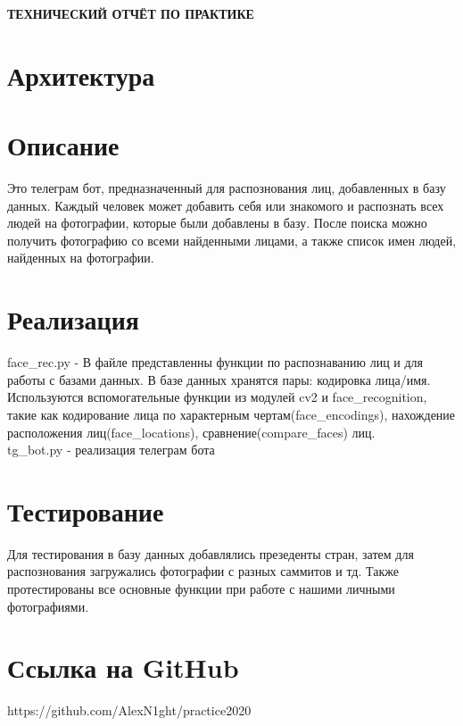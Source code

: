 \begin{center}
\bfseries{\large ТЕХНИЧЕСКИЙ ОТЧЁТ ПО ПРАКТИКЕ}
\end{center}

\section*{Архитектура}
\section*{Описание}
Это телеграм бот, предназначенный для распознования лиц, добавленных в базу данных. Каждый человек может добавить себя или знакомого и распознать всех людей на фотографии, которые были добавлены в базу. После поиска можно получить фотографию со всеми найденными лицами, а также список имен людей, найденных на фотографии. 

\section*{Реализация}

face\_rec.py - В файле представленны функции по распознаванию лиц и для работы с базами данных. В базе данных хранятся пары: кодировка лица/имя. Используются вспомогательные функции из модулей cv2 и face\_recognition, такие как кодирование лица по характерным чертам(face\_encodings), нахождение расположения лиц(face\_locations), сравнение(compare\_faces) лиц.\\
tg\_bot.py - реализация телеграм бота

\section*{Тестирование}

Для тестирования в базу данных добавлялись презеденты стран, затем для распознования загружались фотографии с разных саммитов и тд. Также протестированы все основные функции при работе с нашими личными фотографиями.

\section*{Ссылка на GitHub} https://github.com/AlexN1ght/practice2020
\pagebreak
